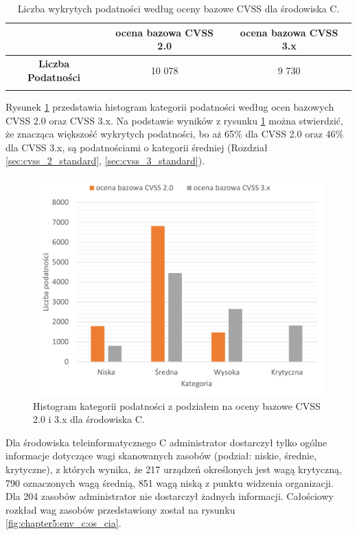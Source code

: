 \begin{table}[tbh]
\caption{Liczba wykrytych podatności według oceny bazowe CVSS dla środowiska C.}
\begin{center}
\label{tab:chapter5:env_c:detected_vulns_nessus}
\begin{tabular}{ccc}
\hline \noalign {\smallskip}
   & ocena bazowa CVSS 2.0 & ocena bazowa CVSS 3.x \\
\hline \noalign {\smallskip}
\textbf{Liczba Podatności}   &      10 078 &         9 730 \\
\hline \noalign {\smallskip}
\end{tabular}
\end{center}
\end{table}

\bigbreak
Rysunek \ref{fig:chapter5:env_c:env_stats} przedstawia histogram kategorii podatności według ocen bazowych CVSS 2.0 oraz CVSS 3.x. Na podstawie wyników z rysunku \ref{fig:chapter5:env_c:env_stats} można stwierdzić, że znacząca większość wykrytych podatności, bo aż 65\% dla CVSS 2.0 oraz 46\% dla CVSS 3.x, są podatnościami o kategorii średniej (Rozdział \ref{sec:cvss_2_standard}, \ref{sec:cvss_3_standard}).


\begin{figure}[!ht]
\centering
\includegraphics[width=.7\textwidth]{Chapters/Srodowiska/env_C/env_c_stats.pdf}
\caption{Histogram kategorii podatności z podziałem na oceny bazowe CVSS 2.0 i 3.x dla środowiska C.}
\label{fig:chapter5:env_c:env_stats}
\end{figure}


\bigbreak
Dla środowiska teleinformatycznego C administrator dostarczył tylko ogólne informacje dotyczące wagi skanowanych zasobów (podział: niskie, średnie, krytyczne), z których wynika, że 217 urządzeń określonych jest wagą krytyczną, 790 oznaczonych wagą średnią, 851 wagą niską z punktu widzenia organizacji. Dla 204 zasobów administrator nie dostarczył żadnych informacji. Całościowy rozkład wag zasobów przedstawiony został na rysunku \ref{fig:chapter5:env_c:os_cia}.

